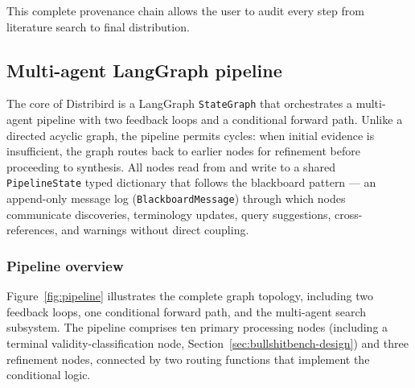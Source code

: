 \documentclass[11pt,a4paper]{article}
\begin{document}
\noindent This complete provenance chain allows the user to audit every step from literature search to final distribution.

\subsection{Multi-agent LangGraph pipeline}

The core of Distribird is a LangGraph \texttt{StateGraph} that orchestrates a multi-agent pipeline with two feedback loops and a conditional forward path. Unlike a directed acyclic graph, the pipeline permits cycles: when initial evidence is insufficient, the graph routes back to earlier nodes for refinement before proceeding to synthesis. All nodes read from and write to a shared \texttt{PipelineState} typed dictionary that follows the blackboard pattern --- an append-only message log (\texttt{BlackboardMessage}) through which nodes communicate discoveries, terminology updates, query suggestions, cross-references, and warnings without direct coupling.

\subsubsection{Pipeline overview}

Figure~\ref{fig:pipeline} illustrates the complete graph topology, including two feedback loops, one conditional forward path, and the multi-agent search subsystem. The pipeline comprises ten primary processing nodes (including a terminal validity-classification node, Section~\ref{sec:bullshitbench-design}) and three refinement nodes, connected by two routing functions that implement the conditional logic.
\end{document}
